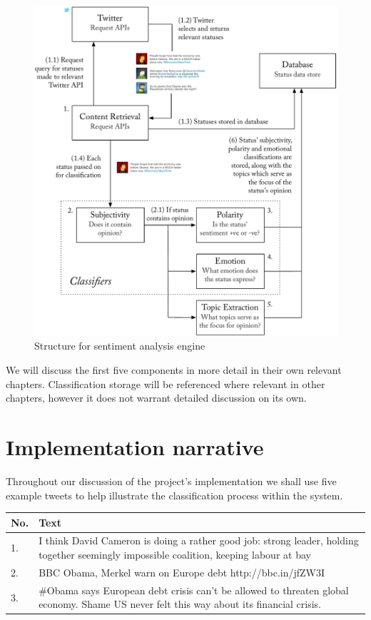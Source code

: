\begin{figure}[h!]
	\caption{Structure for sentiment analysis engine}
	\label{fig:outline_diagram}
	\centering
		\includegraphics[width=1\textwidth]{figures/outline.pdf}
\end{figure}

We will discuss the first five components in more detail in their own relevant chapters. Classification storage will be referenced where relevant in other chapters, however it does not warrant detailed discussion on its own. 

\section{Implementation narrative}

Throughout our discussion of the project's implementation we shall use five example tweets to help illustrate the classification process within the system. 

\begin{tabular}{ | l | p{4in} | }
	\hline
	No. & Text \\
	\hline
	1. & I think David Cameron is doing a rather good job: strong leader, holding together seemingly impossible coalition, keeping labour at bay \\ %
	2. & BBC Obama, Merkel warn on Europe debt http://bbc.in/jfZW3I \\ %
	3. & \#Obama says European debt crisis can't be allowed to threaten global economy. Shame US never felt this way about its financial crisis. \\ %
	\hline
\end{tabular}





